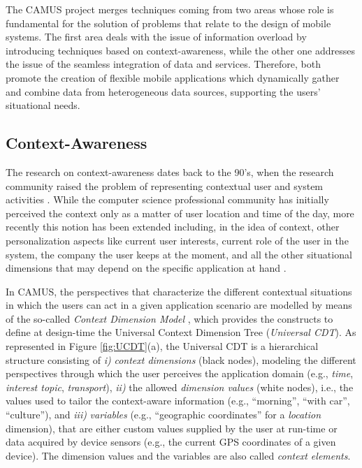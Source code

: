 \label{sec:Rationale}

The CAMUS project merges techniques coming from two areas whose role is fundamental for the solution of problems that   relate to the design of mobile systems. The first area deals with the issue of  information overload by introducing techniques based on  context-awareness, while the other one addresses the issue of  the seamless integration of data and services. Therefore, both promote the creation of flexible mobile applications which dynamically gather and combine data from heterogeneous data sources, supporting the users' situational needs.

\subsection{Context-Awareness}
The research on context-awareness dates back to the 90's, when the research community raised the problem of representing contextual user and system activities \cite{DBLP:conf/huc/AbowdDBDSS99}. While the computer science professional community has initially perceived the context only as a matter of user location and time of the day, more recently this notion has been extended including, in the idea of context, other personalization aspects like current user interests, current role of the user in the system, the company  the user keeps at the moment, and  all the other situational dimensions that may depend on the specific application at hand \cite{DBLP:journals/sigmod/BolchiniCQST07}.

In CAMUS, the perspectives that characterize the different contextual situations in which the users can
act in a given application scenario are modelled  by means of the so-called \emph{Context Dimension Model} \cite{DBLP:journals/cacm/BolchiniCOQRST09}, which provides the constructs to define at design-time
the Universal Context Dimension Tree (\emph{Universal CDT}). As represented in Figure \ref{fig:UCDT}(a), the Universal CDT is a hierarchical structure consisting
of \emph{i)} \emph{context dimensions} (black nodes), modeling the different perspectives through which the user perceives the application domain
(e.g., \emph{time}, \emph{interest topic}, \emph{transport}), \emph{ii)} the allowed \emph{dimension values}
(white nodes), i.e., the values used to tailor the context-aware information (e.g., ``morning'', ``with car'', ``culture''), and \emph{iii)} \emph{variables} (e.g., ``geographic coordinates'' for a \emph{location }dimension), that are either custom values supplied by the user at run-time or data acquired by device sensors (e.g., the current GPS coordinates of a given device).  The dimension values  and the variables are also called \emph{context elements}.


